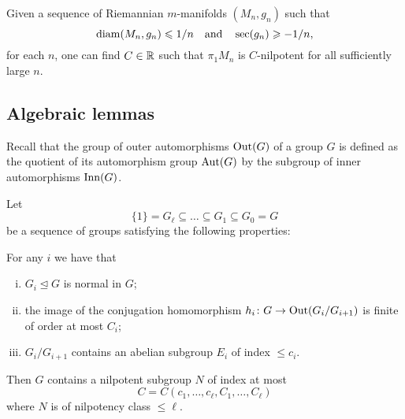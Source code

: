 \documentclass{amsart}
\begin{document}
Given a sequence of Riemannian $m$-manifolds $(M_n,g_n)$
such that
\[\operatorname{\rm diam}(M_n,g_n)\leqslant 1/n
 \quad\text{and}\quad
 \sec(g_n)\geqslant -1/n,
\]
for each $n$, one can find $C\in {\Bbb R}$  such that
$\pi_1M_{n}$ is $C$-nilpotent for all sufficiently large $n$.

\subsection{Algebraic lemmas}

Recall that
the group of outer automorphisms $\operatorname{\rm Out}(G)$ of a group $G$
is defined as the quotient of its automorphism group
$\operatorname{\rm Aut}(G)$ by the subgroup of inner automorphisms $\operatorname{\rm Inn}(G)$.


\begin{lem}\label{lem:cnilp}
Let
$$\{1\}=G_\ell\subseteq \ldots\subseteq G_1\subseteq G_0=G$$
  be a sequence of groups satisfying the following properties:

For any $i$ we have that
\begin{enumerate}[(i)]
\item $G_i \unlhd G$ is normal in $G$;
\item the image of the conjugation homomorphism
$h_i\colon  G\to \operatorname{\rm Out}(G_i/G_{i+1})$ is finite of order at most $C_i$;
\item $G_i/G_{i+1}$ contains an abelian subgroup $E_i$ of index  $\le c_i$.
\end{enumerate}
Then $G$ contains a nilpotent subgroup $N$ of index at most
$$C=C(c_1,\ldots, c_\ell, C_1,\ldots, C_\ell)$$
where $N$ is of nilpotency class $\le \ell$.
\end{lem}
\end{document}
